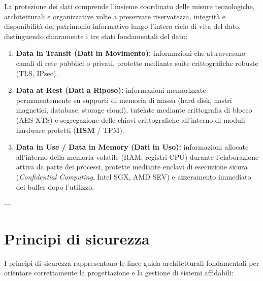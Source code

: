 \documentclass[../../main.tex]{subfiles}
\begin{document}
La protezione dei dati comprende l'insieme coordinato delle misure tecnologiche, architetturali e organizzative volte a preservare riservatezza, integrità e disponibilità del patrimonio informativo lungo l'intero ciclo di vita del dato, distinguendo chiaramente i tre stati fondamentali del dato:
\begin{enumerate}
    \item \textbf{Data in Transit (Dati in Movimento):} informazioni che attraversano canali di rete pubblici o privati, protette mediante suite crittografiche robuste (TLS, IPsec).
    \item \textbf{Data at Rest (Dati a Riposo):} informazioni memorizzate permanentemente su supporti di memoria di massa (hard disk, nastri magnetici, database, storage cloud), tutelate mediante crittografia di blocco (AES-XTS) e segregazione delle chiavi crittografiche all'interno di moduli hardware protetti (\textbf{HSM} / TPM).
    \item \textbf{Data in Use / Data in Memory (Dati in Uso):} informazioni allocate all'interno della memoria volatile (RAM, registri CPU) durante l'elaborazione attiva da parte dei processi, protette mediante enclavi di esecuzione sicura (\textit{Confidential Computing}, Intel SGX, AMD SEV) e azzeramento immediato dei buffer dopo l'utilizzo.
\end{enumerate}

---

\section{Principi di sicurezza}
\label{sec:principi_sicurezza}

I principi di sicurezza rappresentano le linee guida architetturali fondamentali per orientare correttamente la progettazione e la gestione di sistemi affidabili:
\end{document}
